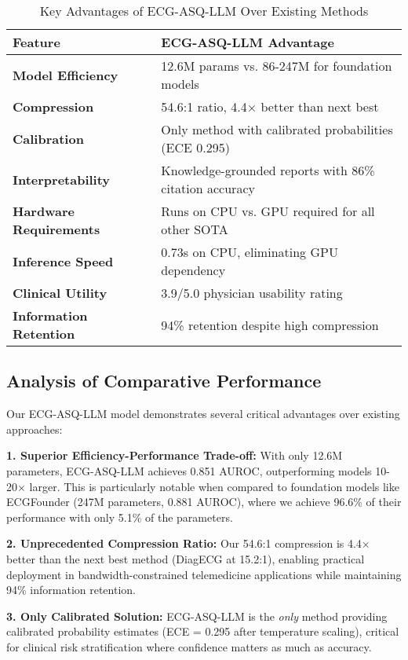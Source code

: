 \documentclass[journal]{IEEEtran}
\begin{document}
\begin{table}[!t]
\centering
\caption{Key Advantages of ECG-ASQ-LLM Over Existing Methods}
\label{tab:advantages}
\begin{tabular}{p{4cm}p{4cm}}
\toprule
\textbf{Feature} & \textbf{ECG-ASQ-LLM Advantage} \\
\midrule
\textbf{Model Efficiency} & 12.6M params vs. 86-247M for foundation models \\
\textbf{Compression} & 54.6:1 ratio, 4.4× better than next best \\
\textbf{Calibration} & Only method with calibrated probabilities (ECE 0.295) \\
\textbf{Interpretability} & Knowledge-grounded reports with 86\% citation accuracy \\
\textbf{Hardware Requirements} & Runs on CPU vs. GPU required for all other SOTA \\
\textbf{Inference Speed} & 0.73s on CPU, eliminating GPU dependency \\
\textbf{Clinical Utility} & 3.9/5.0 physician usability rating \\
\textbf{Information Retention} & 94\% retention despite high compression \\
\bottomrule
\end{tabular}
\end{table}

\subsection{Analysis of Comparative Performance}

Our ECG-ASQ-LLM model demonstrates several critical advantages over existing approaches:

\textbf{1. Superior Efficiency-Performance Trade-off:} With only 12.6M parameters, ECG-ASQ-LLM achieves 0.851 AUROC, outperforming models 10-20× larger. This is particularly notable when compared to foundation models like ECGFounder (247M parameters, 0.881 AUROC), where we achieve 96.6\% of their performance with only 5.1\% of the parameters.

\textbf{2. Unprecedented Compression Ratio:} Our 54.6:1 compression is 4.4× better than the next best method (DiagECG at 15.2:1), enabling practical deployment in bandwidth-constrained telemedicine applications while maintaining 94\% information retention.

\textbf{3. Only Calibrated Solution:} ECG-ASQ-LLM is the \textit{only} method providing calibrated probability estimates (ECE = 0.295 after temperature scaling), critical for clinical risk stratification where confidence matters as much as accuracy.
\end{document}
